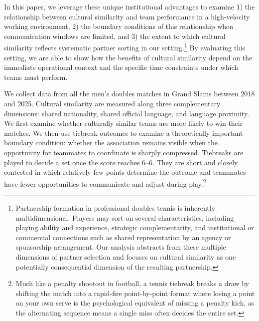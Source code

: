 \documentclass[10pt]{article}
\begin{document}
In this paper, we leverage these unique institutional advantages to examine 1) the relationship between cultural similarity and team performance in a high-velocity working environment, 2) the boundary conditions of this relationship when communication windows are limited, and 3) the extent to which cultural similarity reflects systematic partner sorting in our setting.\footnote{Partnership formation in professional doubles tennis is inherently multidimensional. Players may sort on several characteristics, including playing ability and experience, strategic complementarity, and institutional or commercial connections such as shared representation by an agency or sponsorship arrangement. Our analysis abstracts from these multiple dimensions of partner selection and focuses on cultural similarity as one potentially consequential dimension of the resulting partnership.} By evaluating this setting, we are able to show how the benefits of cultural similarity depend on the immediate operational context and the specific time constraints under which teams must perform.

We collect data from all the men's doubles matches in Grand Slams between 2018 and 2025.  Cultural similarity are measured along three complementary dimensions: shared nationality, shared official language, and  language  proximity. We first examine whether culturally similar teams are more likely to win their matches. We then use tiebreak outcomes to examine a theoretically important boundary condition: whether the association remains visible when the opportunity for teammates to coordinate is sharply compressed. Tiebreaks are played to decide a set once the score reaches 6--6. They are short and closely contested in which relatively few points determine the outcome and teammates have fewer opportunities to communicate and adjust during play.\footnote{Much like a penalty shootout in football, a tennis tiebreak breaks a draw by shifting the match into a rapid-fire point-by-point format where losing a point on your own serve is the psychological equivalent of missing a penalty kick, as the alternating sequence means a single miss often decides the entire set.}
\end{document}
